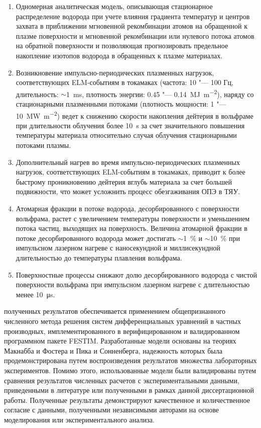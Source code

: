 {}
\begin{enumerate}[beginpenalty=10000] %
    \item Одномерная аналитическая модель, описывающая стационарное распределение водорода при учете влияния градиента температур и центров захвата в приближении мгновенной рекомбинации атомов на обращенной к плазме поверхности и мгновенной рекомбинации или нулевого потока атомов на обратной поверхности и позволяющая прогнозировать предельное накопление изотопов водорода в обращенных к плазме материалах.
    \item Возникновение импульсно-периодических плазменных нагрузок, соответствующих ELM-событиям в токамаках (частота: 10 "--- 100 Гц, длительность: $\sim$\SI{1}{\milli\second}, плотность энергии: 0.45 "--- \SI{0.14}{\mega\joule\per\meter\squared}), наряду со стационарными плазменными потоками (плотность мощности: 1 "--- \SI{10}{\mega\watt\per\meter\squared}) ведет к снижению скорости накопления дейтерия в вольфраме при длительности облучения более \SI{10}{\second} за счет значительного повышения температуры материала относительно случая облучения стационарными потоками плазмы. 
    \item Дополнительный нагрев во время импульсно-периодических плазменных нагрузок, соответствующих ELM-событиям в токамаках, приводит к более быстрому проникновению дейтерия вглубь материала за счет большей подвижности, что может усложнить процесс обезгаживания ОПЭ в ТЯУ. 
    \item Атомарная фракции в потоке водорода, десорбированного с поверхности вольфрама, растет с увеличением температуры поверхности и уменьшением потока частиц, выходящих на поверхность. Величина атомарной фракции в потоке десорбированного водорода может достигать $\sim$1~\% и $\sim$10~\% при импульсном лазерном нагреве с наносекундной и миллисекундной длительностью до температуры плавления вольфрама.
    \item Поверхностные процессы снижают долю десорбированного водорода с чистой поверхности вольфрама при импульсном лазерном нагреве с длительностью менее \SI{10}{\micro\second}.
\end{enumerate}

{\reliability} полученных результатов обеспечивается применением общепризнанного численного метода решения систем дифференциальных уравнений в частных производных, имплементированного в верифицированном и валидированном программном пакете FESTIM. Разработанные модели основаны на теориях Макнабба и Фостера и Пика и Сонненберга, надежность которых была продемонстрирована путем воспроизведения результатов множества лабораторных экспериментов. Помимо этого, использованные модели были валидированы путем сравнения результатов численных расчетов с экспериментальными данными, приведенными в литературе или полученными в рамках данной диссертационной работы. Полученные результаты демонстрируют качественное и количественное согласие с данными, полученными независимыми авторами на основе моделирования или экспериментального анализа.

